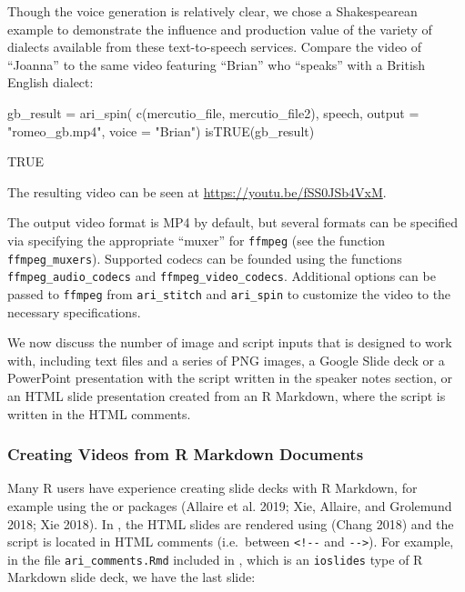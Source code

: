 Though the voice generation is relatively clear, we chose a
Shakespearean example to demonstrate the influence and production value
of the variety of dialects available from these text-to-speech services.
Compare the video of ``Joanna'' to the same video featuring ``Brian''
who ``speaks'' with a British English dialect:

\begin{Schunk}
\begin{Sinput}
gb_result = ari_spin(
  c(mercutio_file, mercutio_file2),
  speech, output = "romeo_gb.mp4", voice = "Brian")
isTRUE(gb_result)
\end{Sinput}
\end{Schunk}

\begin{Schunk}
\begin{Soutput}
[1] TRUE
\end{Soutput}
\end{Schunk}

The resulting video can be seen at \url{https://youtu.be/fSS0JSb4VxM}.

The output video format is MP4 by default, but several formats can be
specified via specifying the appropriate ``muxer'' for \texttt{ffmpeg}
(see the function \texttt{ffmpeg\_muxers}). Supported codecs can be
founded using the functions \texttt{ffmpeg\_audio\_codecs} and
\texttt{ffmpeg\_video\_codecs}. Additional options can be passed to
\texttt{ffmpeg} from \texttt{ari\_stitch} and \texttt{ari\_spin} to
customize the video to the necessary specifications.

We now discuss the number of image and script inputs that  is
designed to work with, including text files and a series of PNG images,
a Google Slide deck or a PowerPoint presentation with the script written
in the speaker notes section, or an HTML slide presentation created from
an R Markdown, where the script is written in the HTML comments.

\hypertarget{creating-videos-from-r-markdown-documents}{%
\subsubsection{Creating Videos from R Markdown
Documents}\label{creating-videos-from-r-markdown-documents}}

Many R users have experience creating slide decks with R Markdown, for
example using the  or  packages
(Allaire et al. 2019; Xie, Allaire, and Grolemund 2018; Xie 2018). In
, the HTML slides are rendered using  (Chang
2018) and the script is located in HTML comments (i.e.~between
\texttt{\textless{}!-\/-} and \texttt{-\/-\textgreater{}}). For example,
in the file \texttt{ari\_comments.Rmd} included in , which is
an \texttt{ioslides} type of R Markdown slide deck, we have the last
slide:

